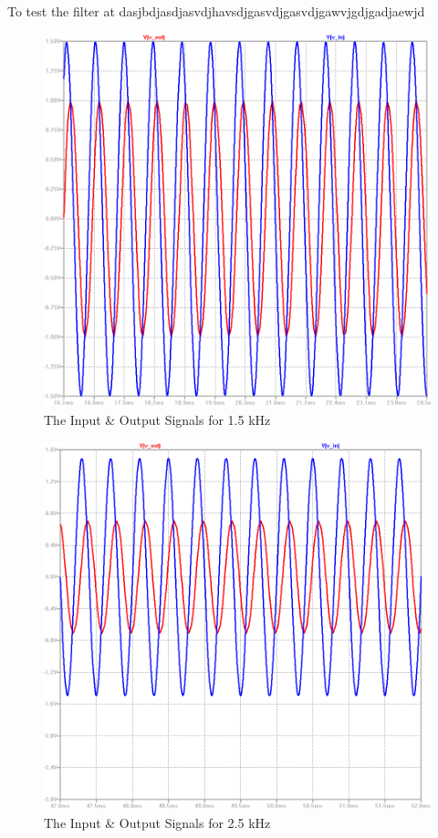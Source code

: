 \documentclass[paper]{IEEEtran}
\begin{document}
	\-\\ \-\\ \-\- To test the filter at dasjbdjasdjasvdjhavsdjgasvdjgasvdjgawvjgdjgadjaewjd 
	
	
\begin{figure}[h!]
	\setlength{\unitlength}{\textwidth}
	\center 
	\includegraphics[width=0.45\unitlength]{lpf_op3.png}
	\caption{\label{fig:lpfop3}The Input \& Output Signals for 1.5 kHz}
\end{figure} 


\begin{figure}[h!]
	\setlength{\unitlength}{\textwidth}
	\center 
	\includegraphics[width=0.45\unitlength]{lpf_op4.png}
	\caption{\label{fig:lpfop4}The Input \& Output Signals for 2.5 kHz}
\end{figure} 
\end{document}
